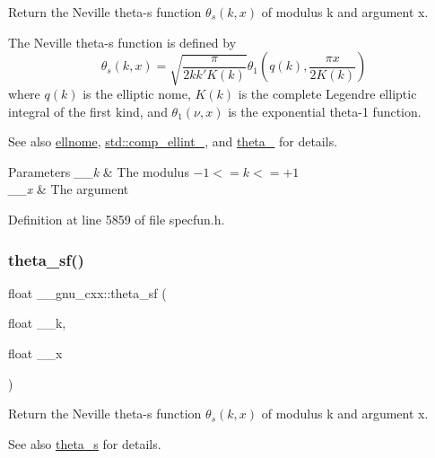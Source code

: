 Return the Neville theta-\/s function $ \theta_s(k,x) $ of modulus {\ttfamily k} and argument {\ttfamily x}.

The Neville theta-\/s function is defined by \[ \theta_s(k,x) = \sqrt{\frac{\pi}{2 k k' K(k)}} \theta_1\left(q(k),\frac{\pi x}{2K(k)}\right) \] where $ q(k) $ is the elliptic nome, $ K(k) $ is the complete Legendre elliptic integral of the first kind, and $ \theta_1(\nu,x) $ is the exponential theta-\/1 function. \begin{DoxySeeAlso}{See also}
\hyperlink{group__mathsf__gnu_ga7bfb34f8b5c0ed7c72040f9cb7034bba}{ellnome}, \hyperlink{group__mathsf__std_gad559217fb01e7a8b7a6e23eeedda64be}{std\+::comp\+\_\+ellint\+\_}, and \hyperlink{group__mathsf__gnu_gaa2e5a3a5f550fe032a596a8b01c878c0}{theta\+\_} for details.
\end{DoxySeeAlso}

\begin{DoxyParams}{Parameters}
{\em \+\_\+\+\_\+k} & The modulus $ -1 <= k <= +1 $ \\
\hline
{\em \+\_\+\+\_\+x} & The argument \\
\hline
\end{DoxyParams}


Definition at line 5859 of file specfun.\+h.

\mbox{\label{group__mathsf__gnu_ga5e69cf30c9a4cc057accc43e8c4bf7a3}} 
\subsubsection{\texorpdfstring{theta\+\_\+sf()}{theta\_sf()}}
{\footnotesize\ttfamily float \+\_\+\+\_\+gnu\+\_\+cxx\+::theta\+\_\+sf (\begin{DoxyParamCaption}\item[{float}]{\+\_\+\+\_\+k,  }\item[{float}]{\+\_\+\+\_\+x }\end{DoxyParamCaption})\hspace{0.3cm}{\ttfamily [inline]}}

Return the Neville theta-\/s function $ \theta_s(k,x) $ of modulus {\ttfamily k} and argument {\ttfamily x}.

\begin{DoxySeeAlso}{See also}
\hyperlink{group__mathsf__gnu_gaf28f2dca107531890b49cccf2bdd67be}{theta\+\_\+s} for details. 
\end{DoxySeeAlso}


